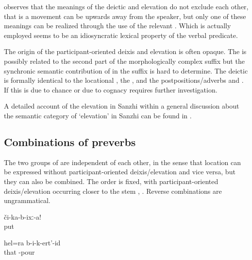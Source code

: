 \citet{Tatevosov2000} observes that the meanings of the deictic and elevation  do not exclude each other, that is a movement can be upwards away from the speaker, but only one of these meanings can be realized through the use of the relevant . Which  is actually employed seems to be an idiosyncratic lexical property of the verbal predicate.

The origin of the participant-oriented deixis and elevation  is often opaque. The   is possibly related to the second part of the morphologically complex  suffix  but the synchronic semantic contribution of  in the  suffix is hard to determine. The deictic    is formally identical to the locational   , the   , and the postpositions/adverbs   and  . If this is due to chance or due to cognacy requires further investigation.

A detailed account of the elevation  in Sanzhi within a general discussion about the semantic category of `elevation' in Sanzhi can be found in \citet{ForkerLTSanzhi}.


\subsection{Combinations of preverbs}
\label{ssec:Combinations of preverbs}

The two groups of  are independent of each other, in the sense that location can be expressed without participant-oriented deixis/elevation and vice versa, but they can also be combined. The order is fixed, with participant-oriented deixis/elevation  occurring closer to the stem , . Reverse combinations are ungrammatical.
%
\begin{exe}
	\ex	\label{ex:Put (it) down verbs}
	\gll	či-ka-b-ixː-a!\\
		put\\
	\glt	{}

	\ex	\label{ex:I pour this in as well verbs}
	\gll	hel=ra	b-i-k-ert'-id\\
		that	-pour\\
	\glt	{}
\end{exe}

